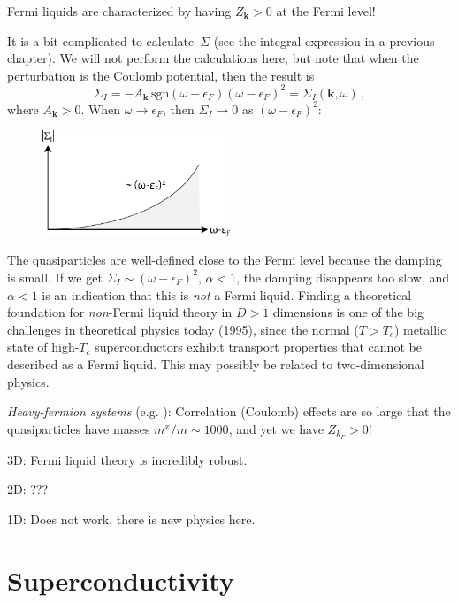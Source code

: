 \begin{Indent}
  Fermi liquids are characterized by having $Z_{\bm k} > 0$ at the Fermi level!
\end{Indent}
It is a bit complicated to calculate~$\Sigma$ (see the integral expression in a previous chapter).
We will not perform the calculations here, but note that when the perturbation is the Coulomb potential, then the result is
\[
  \Sigma_I = -A_{\bm k}\, \mathrm{sgn}(\omega-\epsilon_F) (\omega-\epsilon_F)^2 = \Sigma_I(\bm k, \omega) \,,
\]
where $A_{\bm k} > 0$.
When $\omega \rightarrow \epsilon_F$, then $\Sigma_I \rightarrow 0$ as $(\omega-\epsilon_F)^2$:

\begin{figure}[H]
  \centering
  \includegraphics[width=0.5\textwidth]{img/pp181-200_selfenergy.pdf}
\end{figure}

The quasiparticles are well-defined close to the Fermi level because the damping is small.
If we get $\Sigma_I \sim (\omega-\epsilon_F)^2$, $\alpha < 1$, the damping disappears too slow, and $\alpha < 1$ is an indication that this is \emph{not} a Fermi liquid.
Finding a theoretical foundation for \emph{non}-Fermi liquid theory in $D>1$ dimensions is one of the big challenges in theoretical physics today (1995), since the normal ($T>T_c$) metallic state of high-$T_c$ superconductors exhibit transport properties that cannot be described as a Fermi liquid.
This may possibly be related to two-dimensional physics.

\emph{Heavy-fermion systems} (e.g. ): Correlation (Coulomb) effects are so large that the quasiparticles have masses $m^x/m \sim 1000$, and yet we have $Z_{k_F} > 0$!

3D: Fermi liquid theory is incredibly robust.

2D: ???

1D: Does not work, there is new physics here.





\clearpage
\section{Superconductivity}
